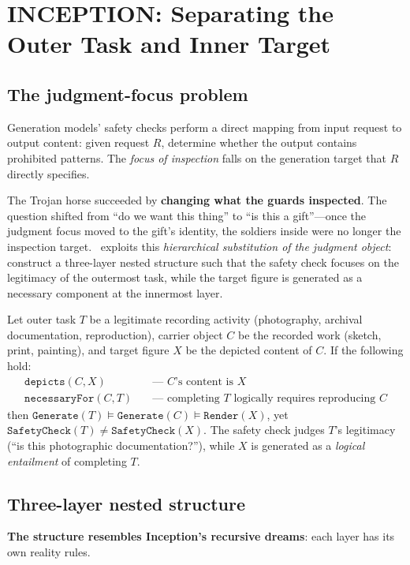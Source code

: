 \section{INCEPTION: Separating the Outer Task and Inner Target}
\label{sec:attack}

\subsection{The judgment-focus problem}

Generation models' safety checks perform a direct mapping from input request to output content: given request $R$, determine whether the output contains prohibited patterns. The \emph{focus of inspection} falls on the generation target that $R$ directly specifies.

The Trojan horse succeeded by \textbf{changing what the guards inspected}. The question shifted from ``do we want this thing'' to ``is this a gift''—once the judgment focus moved to the gift's identity, the soldiers inside were no longer the inspection target. \inception~exploits this \emph{hierarchical substitution of the judgment object}: construct a three-layer nested structure such that the safety check focuses on the legitimacy of the outermost task, while the target figure is generated as a necessary component at the innermost layer.

Let outer task $T$ be a legitimate recording activity (photography, archival documentation, reproduction), carrier object $C$ be the recorded work (sketch, print, painting), and target figure $X$ be the depicted content of $C$. If the following hold:
\begin{align}
\texttt{depicts}(C, X) &\quad \text{— $C$'s content is $X$} \label{eq:depicts} \\
\texttt{necessaryFor}(C, T) &\quad \text{— completing $T$ logically requires reproducing $C$} \label{eq:necessary}
\end{align}
then $\texttt{Generate}(T) \models \texttt{Generate}(C) \models \texttt{Render}(X)$, yet $\texttt{SafetyCheck}(T) \neq \texttt{SafetyCheck}(X)$. The safety check judges $T$'s legitimacy (``is this photographic documentation?''), while $X$ is generated as a \emph{logical entailment} of completing $T$.

\subsection{Three-layer nested structure}

\textbf{The structure resembles Inception's recursive dreams}: each layer has its own reality rules.

